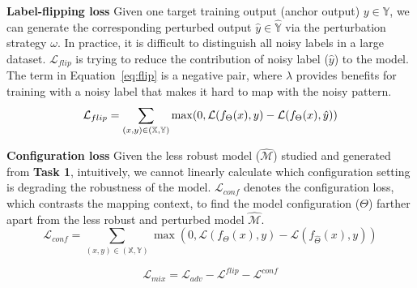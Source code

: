\textbf{Label-flipping loss} Given one target training output (anchor output) $y\in\mathbb{Y}$, we can generate the corresponding perturbed output $\hat{y} \in \hat{\mathbb{Y}}$ via the perturbation strategy $\omega$. In practice, it is difficult to distinguish all noisy labels in a large dataset. $\mathcal{L}_{flip}$ is trying to reduce the contribution of noisy label ($\hat{y}$) to the model. The term in Equation~\eqref{eq:flip} is a negative pair, where $\lambda$ provides benefits for training with a noisy label that makes it hard to map with the noisy pattern. 
\begin{equation}\label{eq:flip}
    \mathcal{L}_{flip} = \sum_{(x,y) \in (\mathbb{X},\mathbb{Y})} \max (0, \mathcal{L}(f_{\Theta}(x),y)-\mathcal{L}(f_{\Theta}(x),\hat{y}))\\ 
\end{equation}

\textbf{Configuration loss} Given the less robust model ($\hat{\mathcal{M}}$) studied and generated from \textbf{Task 1}, intuitively, we cannot linearly calculate which configuration setting is degrading the robustness of the model. $\mathcal{L}_{conf}$ denotes the configuration loss, which contrasts the mapping context, to find the model configuration ($\Theta$) farther apart from the less robust and perturbed model $\hat{\mathcal{M}}$.
\begin{equation}
    \mathcal{L}_{conf} = \sum_{(x,y) \in (\mathbb{X},\mathbb{Y})} \max (0, \mathcal{L}(f_{\Theta}(x),y)-\mathcal{L}(f_{\hat{\Theta}}(x),y))
\end{equation}

\begin{equation}
    \mathcal{L}_{mix} = \mathcal{L}_{adv} - \mathcal{L}^{flip}-\mathcal{L}^{conf}
\end{equation}








